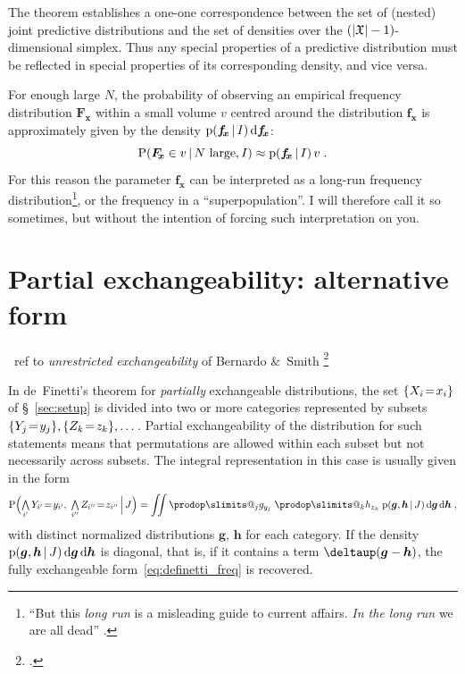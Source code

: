 \documentclass[\ifafour a4paper,12pt,\else a5paper,10pt,\fi%
onecolumn,oneside,article,%
british%
]{memoir}
\makeatletter
\theoremstyle{remark}
\theoremstyle{innote}
\def\prod{\DOTSI\prodop\slimits@}
\newcommand*{\citep}{\footcites}
\newcommand*{\amp}{\&}
\newcommand*{\delt}{\deltaup}%
\newcommand*{\di}{\mathrm{d}}%
\newcommand*{\Land}{\mathop{\textstyle\bigwedge}}
\DeclarePairedDelimiter\abs{\lvert}{\rvert}
\DeclarePairedDelimiter\set{\{}{\}}
\newcommand*{\pf}{\mathrm{p}}%
\newcommand*{\p}{\mathrm{P}}%
\renewcommand*{\|}[1][]{\nonscript\,#1\vert\nonscript\,\mathopen{}}
\newcommand*{\sect}{\S}%
\newcommand*{\puzzle}{{\fontencoding{U}\fontfamily{fontawesometwo}\selectfont\symbol{225}}}
\newcommand{\mynote}[1]{ {\color{notecolour}\puzzle\ #1}}
\renewcommand*{\=}{\TextOrMath\texteq\eq}
\newcommand*{\X}[1]{X_{#1}}
\newcommand*{\x}[1]{x_{#1}}
\newcommand*{\Y}[1]{Y_{#1}}
\newcommand*{\y}[1]{y_{#1}}
\newcommand*{\Z}[1]{Z_{#1}}
\newcommand*{\z}[1]{z_{#1}}
\newcommand*{\sx}{\mathfrak{X}}
\newcommand*{\vf}{v}
\newcommand*{\fx}{\bm{f_{\!x}}}
\newcommand*{\Fx}{\bm{F_{\!x}}}
\newcommand*{\bg}{\bm{g}}
\newcommand*{\bh}{\bm{h}}
\newcommand*{\zI}{J}
\makeatother
\begin{document}
The theorem establishes a one-one correspondence between the set of
(nested) joint predictive distributions and the set of densities over the
$(\abs{\sx}-1)$-dimensional simplex. Thus any special properties of a
predictive distribution must be reflected in special properties of its
corresponding density, and vice versa.

For enough large $N$, the probability of observing an empirical frequency
distribution $\Fx$ within a small volume $\vf$ centred around the
distribution $\fx$ is approximately given by the density
$\pf(\fx \| I)\,\di\fx$:
\begin{equation}
  \label{eq:longrun_freq}
  \p( \Fx \in v \| \text{$N$ large}, I)
  \approx \pf(\fx \| I)\,v \;.
\end{equation}
For this reason the parameter $\fx$ can be interpreted as a long-run
frequency distribution\footnote{\enquote{But this \emph{long run} is a
    misleading guide to current affairs. \emph{In the long run} we are all
    dead} \parencite[\sect~3.I p.~65]{keynes1923_r2013}.}, or the frequency
in a \enquote{superpopulation}. I will therefore call it so sometimes, but
without the intention of forcing such interpretation on you.


\section{Partial exchangeability: alternative form}
\label{sec:partial_exch}

\mynote{ref to \emph{unrestricted exchangeability} of Bernardo \amp\ Smith
  \citep{bernardoetal1994_r2000}}


In de~Finetti's theorem for \emph{partially} exchangeable distributions,
the set $\set{\X{i}\=\x{i}}$ of \sect~\ref{sec:setup} is divided into two
or more categories represented by subsets
$\set{\Y{j}\=\y{j}}, \set{\Z{k}\=\z{k}}, \dotsc$. Partial exchangeability
of the distribution for such statements means that permutations are allowed
within each subset but not necessarily across subsets. The integral
representation in this case %
is usually given in the form
\begin{equation}
  \label{eq:partialdefinetti}
  \p\Bigl( \Land_{i'}\Y{i'}\=\y{i'},\;
  \Land_{i''}\Z{i''}\=\z{i''} \|[\Big] \zI\Bigr) =
  \iint
  \prod_{j} g_{\y{j}}\;
  \prod_{k} h_{\z{k}}\;
  \pf(\bg,\bh \| \zI)\,\di\bg\,\di\bh \;,
\end{equation}
with distinct normalized distributions $\bg$, $\bh$ for each category. If
the density $\pf(\bg,\bh \| \zI)\,\di\bg\,\di\bh$ is diagonal, that is, if
it contains a term $\delt(\bg-\bh)$, the fully exchangeable
form~\eqref{eq:definetti_freq} is recovered.
\end{document}
